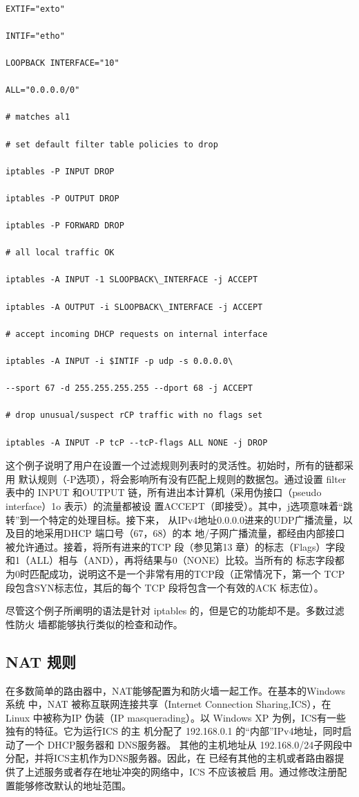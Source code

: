 \begin{verbatim}
    
EXTIF="exto"

INTIF="etho"

LOOPBACK INTERFACE="10"

ALL="0.0.0.0/0"

# matches al1

# set default filter table policies to drop

iptables -P INPUT DROP

iptables -P OUTPUT DROP

iptables -P FORWARD DROP

# all local traffic OK

iptables -A INPUT -1 SLOOPBACK\_INTERFACE -j ACCEPT

iptables -A OUTPUT -i SLOOPBACK\_INTERFACE -j ACCEPT

# accept incoming DHCP requests on internal interface

iptables -A INPUT -i $INTIF -p udp -s 0.0.0.0\

--sport 67 -d 255.255.255.255 --dport 68 -j ACCEPT

# drop unusual/suspect rCP traffic with no flags set

iptables -A INPUT -P tcP --tcP-flags ALL NONE -j DROP
\end{verbatim}

这个例子说明了用户在设置一个过滤规则列表时的灵活性。初始时，所有的链都采用
默认规则（-P选项），将会影响所有没有匹配上规则的数据包。通过设置 filter 表中的 INPUT
和OUTPUT 链，所有进出本计算机（采用伪接口（pseudo interface）1o 表示）的流量都被设
置ACCEPT（即接受）。其中，j选项意味着“跳转”到一个特定的处理目标。接下来，
从IPv4地址0.0.0.0进来的UDP广播流量，以及目的地采用DHCP 端口号（67，68）的本
地/子网广播流量，都经由内部接口被允许通过。接着，将所有进来的TCP 段（参见第13
章）的标志（Flags）字段和1（ALL）相与（AND），再将结果与0（NONE）比较。当所有的
标志字段都为0时匹配成功，说明这不是一个非常有用的TCP段（正常情况下，第一个 TCP
段包含SYN标志位，其后的每个 TCP 段将包含一个有效的ACK 标志位）。

尽管这个例子所阐明的语法是针对 iptables 的，但是它的功能却不是。多数过滤性防火
墙都能够执行类似的检查和动作。

\subsection{NAT 规则}

在多数简单的路由器中，NAT能够配置为和防火墙一起工作。在基本的Windows 系统
中，NAT 被称互联网连接共享（Internet Connection Sharing,ICS），在 Linux 中被称为IP
伪装（IP masquerading）。以 Windows XP 为例，ICS有一些独有的特征。它为运行ICS 的主
机分配了 192.168.0.1 的“内部”IPv4地址，同时启动了一个 DHCP服务器和 DNS服务器。
其他的主机地址从 192.168.0/24子网段中分配，并将ICS主机作为DNS服务器。因此，在
已经有其他的主机或者路由器提供了上述服务或者存在地址冲突的网络中，ICS 不应该被启
用。通过修改注册配置能够修改默认的地址范围。

